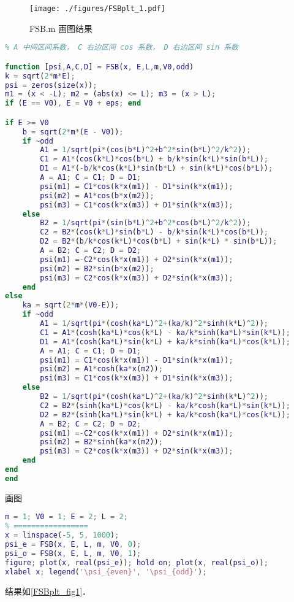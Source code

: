 

\begin{figure}[ht]
\centering
\texttt{[image: ./figures/FSBplt\_1.pdf]}
\caption{FSB.m 画图结果} \label{FSBplt_fig1}
\end{figure}

\begin{lstlisting}[language=matlab, caption=FSB.m]
% m 质量，V0 势垒，E 能量， L 势垒半宽， odd 奇函数 true 偶函数 false
% A 中间区间系数， C 右边区间 cos 系数， D 右边区间 sin 系数

function [psi,A,C,D] = FSB(x, E,L,m,V0,odd)
k = sqrt(2*m*E);
psi = zeros(size(x));
m1 = (x < -L); m2 = (abs(x) <= L); m3 = (x > L);
if (E == V0), E = V0 + eps; end

if E >= V0
    b = sqrt(2*m*(E - V0));
    if ~odd
        A1 = 1/sqrt(pi*(cos(b*L)^2+b^2*sin(b*L)^2/k^2));
        C1 = A1*(cos(k*L)*cos(b*L) + b/k*sin(k*L)*sin(b*L));
        D1 = A1*(-b/k*cos(k*L)*sin(b*L) + sin(k*L)*cos(b*L));
        A = A1; C = C1; D = D1;
        psi(m1) = C1*cos(k*x(m1)) - D1*sin(k*x(m1));
        psi(m2) = A1*cos(b*x(m2));
        psi(m3) = C1*cos(k*x(m3)) + D1*sin(k*x(m3));
    else
        B2 = 1/sqrt(pi*(sin(b*L)^2+b^2*cos(b*L)^2/k^2));
        C2 = B2*(cos(k*L)*sin(b*L) - b/k*sin(k*L)*cos(b*L));
        D2 = B2*(b/k*cos(k*L)*cos(b*L) + sin(k*L) * sin(b*L));
        A = B2; C = C2; D = D2;
        psi(m1) =-C2*cos(k*x(m1)) + D2*sin(k*x(m1));
        psi(m2) = B2*sin(b*x(m2));
        psi(m3) = C2*cos(k*x(m3)) + D2*sin(k*x(m3));
    end
else
    ka = sqrt(2*m*(V0-E));
    if ~odd
        A1 = 1/sqrt(pi*(cosh(ka*L)^2+(ka/k)^2*sinh(k*L)^2));
        C1 = A1*(cosh(ka*L)*cos(k*L) - ka/k*sinh(ka*L)*sin(k*L));
        D1 = A1*(cosh(ka*L)*sin(k*L) + ka/k*sinh(ka*L)*cos(k*L));
        A = A1; C = C1; D = D1;
        psi(m1) = C1*cos(k*x(m1)) - D1*sin(k*x(m1));
        psi(m2) = A1*cosh(ka*x(m2));
        psi(m3) = C1*cos(k*x(m3)) + D1*sin(k*x(m3));
    else
        B2 = 1/sqrt(pi*(cosh(ka*L)^2+(ka/k)^2*sinh(k*L)^2));
        C2 = B2*(sinh(ka*L)*cos(k*L) - ka/k*cosh(ka*L)*sin(k*L));
        D2 = B2*(sinh(ka*L)*sin(k*L) + ka/k*cosh(ka*L)*cos(k*L));
        A = B2; C = C2; D = D2;
        psi(m1) =-C2*cos(k*x(m1)) + D2*sin(k*x(m1));
        psi(m2) = B2*sinh(ka*x(m2));
        psi(m3) = C2*cos(k*x(m3)) + D2*sin(k*x(m3));
    end
end
end
\end{lstlisting}

画图
\begin{lstlisting}[language=matlab]
% === 设置参数 =====
m = 1; V0 = 1; E = 2; L = 2;
% =================
x = linspace(-5, 5, 1000);
psi_e = FSB(x, E, L, m, V0, 0);
psi_o = FSB(x, E, L, m, V0, 1);
figure; plot(x, real(psi_e)); hold on; plot(x, real(psi_o));
xlabel x; legend('\psi_{even}', '\psi_{odd}');
\end{lstlisting}
结果如\autoref{FSBplt_fig1}．


